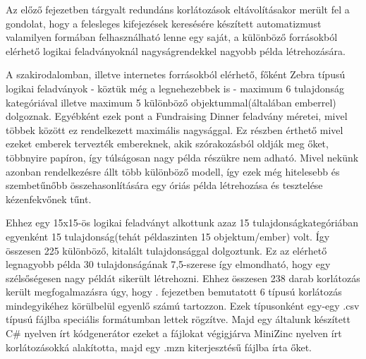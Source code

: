 \documentclass[12pt,a4paper]{report}
\begin{document}
    Az előző fejezetben tárgyalt redundáns korlátozások eltávolításakor merült fel a gondolat, hogy a felesleges kifejezések keresésére készített automatizmust valamilyen formában felhasználható lenne egy saját, a különböző forrásokból elérhető logikai feladványoknál nagyságrendekkel nagyobb példa létrehozására.
    
    A szakirodalomban, illetve internetes forrásokból elérhető, főként Zebra típusú logikai feladványok - köztük még a legnehezebbek is - maximum 6 tulajdonság kategóriával illetve maximum 5 különböző objektummal(általában emberrel) dolgoznak.
    Egyébként ezek pont a Fundraising Dinner feladvány méretei, mivel többek között ez rendelkezett maximális nagysággal.
    Ez részben érthető mivel ezeket emberek tervezték embereknek, akik szórakozásból oldják meg őket, többnyire papíron, így túlságosan nagy példa részükre nem adható.
    Mivel nekünk azonban rendelkezésre állt több különböző modell, így ezek még hitelesebb és szembetűnőbb összehasonlítására egy óriás példa létrehozása és tesztelése kézenfekvőnek tűnt.
    
    Ehhez egy 15x15-ös logikai feladványt alkottunk azaz 15 tulajdonságkategóriában egyenként 15 tulajdonság(tehát példaszinten 15 objektum/ember) volt.
    Így összesen 225 különböző, kitalált tulajdonsággal dolgoztunk. Ez az elérhető legnagyobb példa 30 tulajdonságának 7,5-szerese így elmondható, hogy egy szélsőségesen nagy példát sikerült létrehozni.
    Ehhez összesen 238 darab korlátozás került megfogalmazásra úgy, hogy . fejezetben bemutatott 6 típusú korlátozás mindegyikéhez körülbelül egyenlő számú tartozzon.
    Ezek típusonként egy-egy .csv típusú fájlba speciális formátumban lettek rögzítve.
    Majd egy általunk készített C\# nyelven írt kódgenerátor ezeket a fájlokat végigjárva MiniZinc nyelven írt korlátozásokká alakította, majd egy .mzn kiterjesztésű fájlba írta őket.
    
\end{document}
